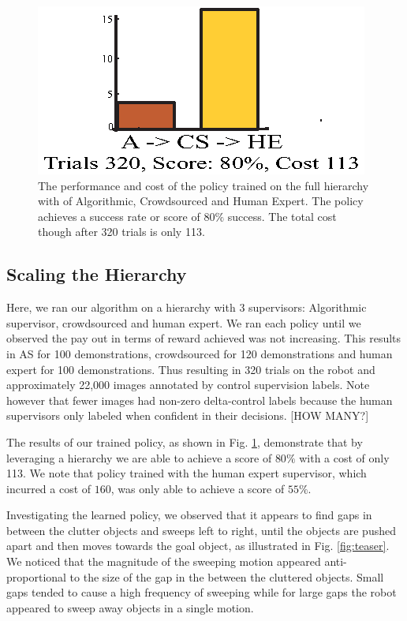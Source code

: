 \documentclass[10pt, conference]{ieeeconf}      %
\begin{document}
\begin{figure}[t]
\includegraphics{f_figs/big_data.eps}
\centering 
\caption{ \footnotesize  The performance and cost of the policy trained on the full hierarchy with of Algorithmic, Crowdsourced and Human Expert. The policy achieves a success rate or score of $80\%$ success. The total cost though after 320 trials is only 113.  }
\vspace*{-20pt}
\label{fig:big_data}
\end{figure}

\subsection{Scaling the Hierarchy}
Here, we ran our algorithm on a hierarchy with 3 supervisors: Algorithmic supervisor, crowdsourced and human
expert. We ran each policy until we observed the pay out in terms of reward achieved was not increasing. This results in
AS for 100 demonstrations, crowdsourced for 120 demonstrations and human expert for 100 demonstrations. Thus resulting
in 320 trials on the robot and approximately 22,000 images annotated by control supervision labels. Note however that
fewer images had non-zero delta-control labels because the human supervisors only labeled when confident in their
decisions. {\color{blue} [HOW MANY?]}

The results of our trained policy, as shown in Fig. \ref{fig:big_data}, demonstrate that by leveraging a hierarchy we are able to achieve a score of $80\%$ with a cost of only 113. We note that policy trained with the human expert supervisor, which incurred a cost of $160$, was only able to achieve a score of $55\%$. 

Investigating the learned policy, we observed that it appears to find gaps in between the clutter objects and sweeps
left to right,  until the objects are pushed apart and then moves towards the goal object, as illustrated in Fig.
\ref{fig:teaser}. We noticed that the magnitude of the sweeping motion appeared anti-proportional to the size of the gap in
the between the cluttered objects. Small gaps tended to cause a high frequency of sweeping while for large gaps the
robot appeared to sweep away objects in a single motion.
\end{document}
